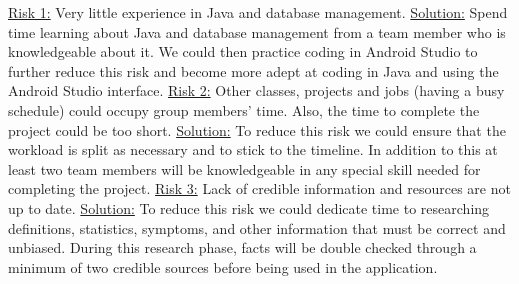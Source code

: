 \documentclass[letterpaper,12pt,titlepage]{article}
\begin{document}
\underline{Risk 1:} Very little experience in Java and database management.
\newline
\underline{Solution:} Spend time learning about Java and database management from a team member who is knowledgeable about it. We could then practice coding in Android Studio to further reduce this risk and become more adept at coding in Java and using the Android Studio interface.
\newline
\newline
\underline{Risk 2:} Other classes, projects and jobs (having a busy schedule) could occupy group members’ time. Also, the time to complete the project could be too short.
\newline
\underline{Solution:} To reduce this risk we could ensure that the workload is split as necessary and to stick to the timeline. In addition to this at least two team members will be knowledgeable in any special skill needed for completing the project.
\newline
\newline
\underline{Risk 3:} Lack of credible information and resources are not up to date.
\newline
\underline{Solution:} To reduce this risk we could dedicate time to researching definitions, statistics, symptoms, and other information that must be correct and unbiased. During this research phase, facts will be double checked through a minimum of  two credible sources before being used in the application.
\newpage
\end{document}

